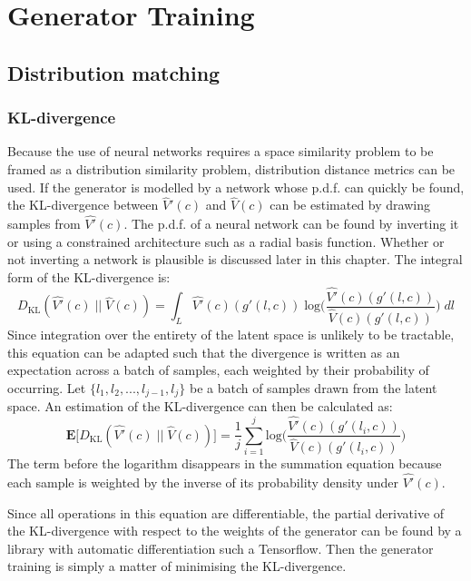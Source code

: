 \documentclass[../../main.tex]{subfiles}
\begin{document}
\chapter{Generator Training} \label{chapter:generatorTraining}

\section{Distribution matching} \label{section:distributionMatching}

\subsection{KL-divergence} \label{subsection:klDivergence}

Because the use of neural networks requires a space similarity problem to be framed as a distribution similarity problem, distribution distance metrics can be used.
If the generator is modelled by a network whose p.d.f. can quickly be found, the KL-divergence between $\hat{V}'(c)$ and $\hat{V}(c)$ can be estimated by drawing samples from $\hat{V'}(c)$.
The p.d.f. of a neural network can be found by inverting it or using a constrained architecture such as a radial basis function.
Whether or not inverting a network is plausible is discussed later in this chapter.
The integral form of the KL-divergence is:
$$D_{\text{KL}}(\hat{V'}(c) \; || \; \hat{V}(c)) = 
\int_L \hat{V'}(c)(g'(l, c)) \; \text{log} \bigg(\frac
{\hat{V'}(c)(g'(l, c))}{\hat{V}(c)(g'(l, c))}
\bigg) \; dl $$
Since integration over the entirety of the latent space is unlikely to be tractable, this equation can be adapted such that the divergence is written as an expectation across a batch of samples, each weighted by their probability of occurring.
Let $\{l_1, l_2, ..., l_{j-1}, l_j\}$ be a batch of samples drawn from the latent space.
An estimation of the KL-divergence can then be calculated as:
$$\textbf{E}\big[D_{\text{KL}}(\hat{V'}(c) \; || \; \hat{V}(c))\big] =
\frac{1}{j}\sum_{i=1}^{j}
\text{log} \bigg(\frac
{\hat{V'}(c)(g'(l_i, c))}{\hat{V}(c)(g'(l_i, c))}
\bigg)
$$
The term before the logarithm disappears in the summation equation because each sample is weighted by the inverse of its probability density under $\hat{V'}(c)$.

Since all operations in this equation are differentiable, the partial derivative of the KL-divergence with respect to the weights of the generator can be found by a library with automatic differentiation such a Tensorflow.
Then the generator training is simply a matter of minimising the KL-divergence.
\end{document}
